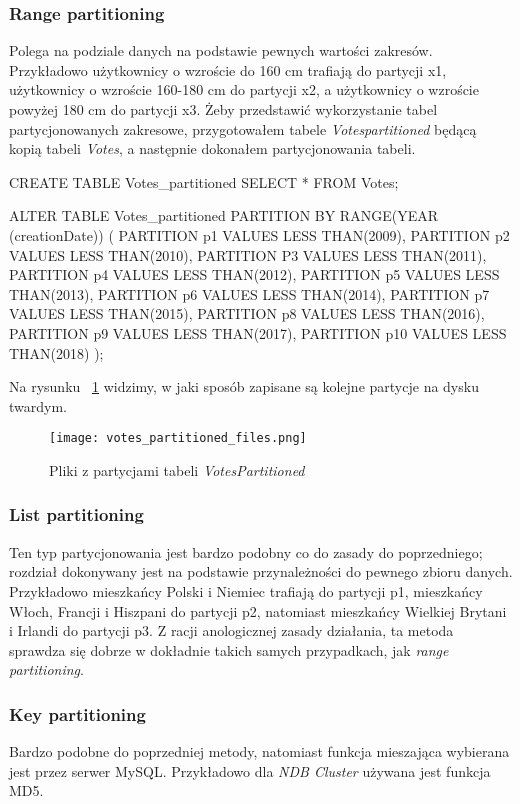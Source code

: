 \subsubsection{Range partitioning}
Polega na podziale danych na podstawie pewnych wartości zakresów. Przykładowo użytkownicy o wzroście do 160 cm trafiają do partycji x1, użytkownicy o wzroście 160-180 cm do partycji x2, a użytkownicy o wzroście powyżej 180 cm do partycji x3.
Żeby przedstawić wykorzystanie tabel partycjonowanych zakresowe, przygotowałem tabele \textit{Votes\textunderscore partitioned} będącą kopią tabeli \textit{Votes}, a następnie dokonałem partycjonowania tabeli.
\begin{spverbatim}
	CREATE TABLE Votes_partitioned SELECT * FROM Votes;
\end{spverbatim}
\begin{spverbatim}
	ALTER TABLE Votes_partitioned PARTITION BY RANGE(YEAR (creationDate)) (
	PARTITION p1 VALUES LESS THAN(2009),
	PARTITION p2 VALUES LESS THAN(2010),
	PARTITION P3 VALUES LESS THAN(2011),
	PARTITION p4 VALUES LESS THAN(2012),
	PARTITION p5 VALUES LESS THAN(2013),
	PARTITION p6 VALUES LESS THAN(2014),
	PARTITION p7 VALUES LESS THAN(2015),
	PARTITION p8 VALUES LESS THAN(2016),
	PARTITION p9 VALUES LESS THAN(2017),
	PARTITION p10 VALUES LESS THAN(2018)
	);
\end{spverbatim}
Na rysunku ~\ref{fig:votes_partitioned_files} widzimy, w jaki sposób zapisane są kolejne partycje na dysku twardym.

\begin{figure}
	\caption{Pliki z partycjami tabeli \textit{Votes\textunderscore Partitioned}}
	\centering
	\texttt{[image: votes\_partitioned\_files.png]}
	\label{fig:votes_partitioned_files}
\end{figure}

\subsubsection{List partitioning}
Ten typ partycjonowania jest bardzo podobny co do zasady do poprzedniego; rozdział dokonywany jest na podstawie przynależności do pewnego zbioru danych. Przykładowo mieszkańcy Polski i Niemiec trafiają do partycji p1, mieszkańcy Włoch, Francji i Hiszpani do partycji p2, natomiast mieszkańcy Wielkiej Brytani i Irlandi do partycji p3. Z racji anologicznej zasady działania, ta metoda sprawdza się dobrze w dokładnie takich samych przypadkach, jak \textit{range partitioning}.
\subsubsection{Key partitioning}
Bardzo podobne do poprzedniej metody, natomiast funkcja mieszająca wybierana jest przez serwer MySQL. Przykładowo dla \textit{NDB Cluster} używana jest funkcja MD5.
